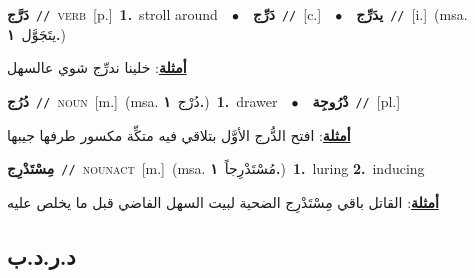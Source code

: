\documentclass[10pt,a4paper,twoside]{article} %
\begin{document}
\begin{multicols}{2}
{\setlength\topsep{0pt}\textbf{\foreignlanguage{arabic}{دَرَّج}}\ {\color{gray}\texttt{//}\color{black}}\ \textsc{verb}\ [p.]\ \textbf{1.}~stroll around\ \ $\bullet$\ \ \setlength\topsep{0pt}\textbf{\foreignlanguage{arabic}{دَرِّج}}\ {\color{gray}\texttt{//}\color{black}}\ [c.]\ \ $\bullet$\ \ \setlength\topsep{0pt}\textbf{\foreignlanguage{arabic}{يدَرِّج}}\ {\color{gray}\texttt{//}\color{black}}\ [i.]\ \color{gray}(msa. \foreignlanguage{arabic}{يتَجَوَّل}~\foreignlanguage{arabic}{\textbf{١.}})\color{black}\  \begin{flushright}\color{gray}\foreignlanguage{arabic}{\textbf{\underline{\foreignlanguage{arabic}{أمثلة}}}: خلينا ندرِّج شوي عالسهل}\end{flushright}\color{black}} \vspace{2mm}

{\setlength\topsep{0pt}\textbf{\foreignlanguage{arabic}{دُرُج}}\ {\color{gray}\texttt{//}\color{black}}\ \textsc{noun}\ [m.]\ \color{gray}(msa. \foreignlanguage{arabic}{دُرْج}~\foreignlanguage{arabic}{\textbf{١.}})\color{black}\ \textbf{1.}~drawer\ \ $\bullet$\ \ \setlength\topsep{0pt}\textbf{\foreignlanguage{arabic}{دْرُوجِة}}\ {\color{gray}\texttt{//}\color{black}}\ [pl.]\  \begin{flushright}\color{gray}\foreignlanguage{arabic}{\textbf{\underline{\foreignlanguage{arabic}{أمثلة}}}: افتح الدُّرج الأوَّل بتلاقي فيه متكِّة مكسور طرفها جيبها}\end{flushright}\color{black}} \vspace{2mm}

{\setlength\topsep{0pt}\textbf{\foreignlanguage{arabic}{مِسْتَدْرِج}}\ {\color{gray}\texttt{//}\color{black}}\ \textsc{noun\textunderscore act}\ [m.]\ \color{gray}(msa. \foreignlanguage{arabic}{مُسْتَدْرِجاً}~\foreignlanguage{arabic}{\textbf{١.}})\color{black}\ \textbf{1.}~luring  \textbf{2.}~inducing\  \begin{flushright}\color{gray}\foreignlanguage{arabic}{\textbf{\underline{\foreignlanguage{arabic}{أمثلة}}}: القاتل باقي مِسْتَدْرِج الضحية لبيت السهل الفاضي قبل ما يخلص عليه}\end{flushright}\color{black}} \vspace{2mm}

\vspace{-3mm}
\subsection*{\color{blue}\foreignlanguage{arabic}{د.ر.د.ب}\color{blue}{}} 


\end{multicols}
\end{document}
